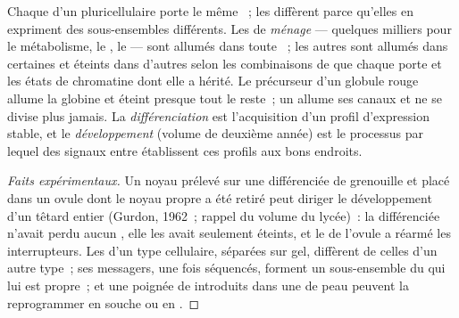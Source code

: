 \begin{proposition}\label{prop:b1:expression-control:differentiation}
Chaque  d'un  pluricellulaire porte le même ~; les
 diffèrent parce qu'elles en expriment des sous-ensembles
différents. Les  de \emph{ménage} --- quelques milliers pour le
métabolisme, le , le  --- sont allumés dans toute
~; les autres sont allumés dans certaines  et éteints
dans d'autres selon les combinaisons de  que
chaque  porte et les états de chromatine dont elle a hérité. Le
précurseur d'un globule rouge allume la globine et éteint presque tout
le reste~; un  allume ses canaux et ne se divise plus jamais. La
\emph{différenciation} est l'acquisition d'un profil d'expression
stable, et le \emph{développement} (volume de deuxième année) est le
processus par lequel des signaux entre  établissent ces profils
aux bons endroits.
\end{proposition}
\begin{proof}[Faits expérimentaux]
Un noyau prélevé sur une  différenciée de grenouille et placé
dans un ovule dont le noyau propre a été retiré peut diriger le
développement d'un têtard entier (Gurdon, 1962~; rappel du volume du
lycée)~: la  différenciée n'avait perdu aucun , elle les
avait seulement éteints, et le  de l'ovule a réarmé les
interrupteurs. Les  d'un type cellulaire, séparées sur gel,
diffèrent de celles d'un autre type~; ses messagers, une fois séquencés,
forment un sous-ensemble du  qui lui est propre~; et une poignée
de  introduits dans une  de peau peuvent
la reprogrammer en  souche ou en .
\end{proof}

